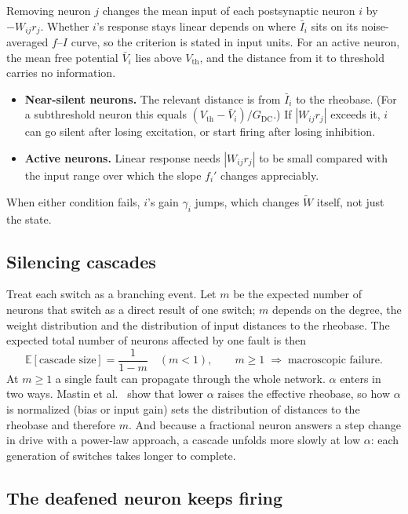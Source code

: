 \documentclass[11pt,a4paper]{article}
\newcommand{\E}{\mathbb{E}}
\newcommand{\Wt}{\tilde W}
\begin{document}
Removing neuron $j$ changes the mean input of each postsynaptic neuron $i$ by $-W_{ij} r_j$. Whether $i$'s response stays linear depends on where $\bar I_i$ sits on its noise-averaged $f$--$I$ curve, so the criterion is stated in input units. For an active neuron, the mean free potential $\bar V_i$ lies above $V_{\mathrm{th}}$, and the distance from it to threshold carries no information.
\begin{itemize}
  \item \textbf{Near-silent neurons.} The relevant distance is from $\bar I_i$ to the rheobase. (For a subthreshold neuron this equals $(V_{\mathrm{th}} - \bar V_i)/G_{\mathrm{DC}}$.) If $|W_{ij} r_j|$ exceeds it, $i$ can go silent after losing excitation, or start firing after losing inhibition.
  \item \textbf{Active neurons.} Linear response needs $|W_{ij} r_j|$ to be small compared with the input range over which the slope $f_i'$ changes appreciably.
\end{itemize}
When either condition fails, $i$'s gain $\gamma_i$ jumps, which changes $\Wt$ itself, not just the state.

\subsection{Silencing cascades}

Treat each switch as a branching event. Let $m$ be the expected number of neurons that switch as a direct result of one switch; $m$ depends on the degree, the weight distribution and the distribution of input distances to the rheobase. The expected total number of neurons affected by one fault is then
\begin{equation}
\E[\text{cascade size}] = \frac{1}{1 - m} \quad (m < 1), \qquad m \ge 1 \;\Rightarrow\; \text{macroscopic failure}.
\end{equation}
At $m\ge 1$ a single fault can propagate through the whole network. $\alpha$ enters in two ways. Mastin et al.~\cite{mastin2026} show that lower $\alpha$ raises the effective rheobase, so how $\alpha$ is normalized (bias or input gain) sets the distribution of distances to the rheobase and therefore $m$. And because a fractional neuron answers a step change in drive with a power-law approach, a cascade unfolds more slowly at low $\alpha$: each generation of switches takes longer to complete.

\subsection{The deafened neuron keeps firing}
\end{document}
